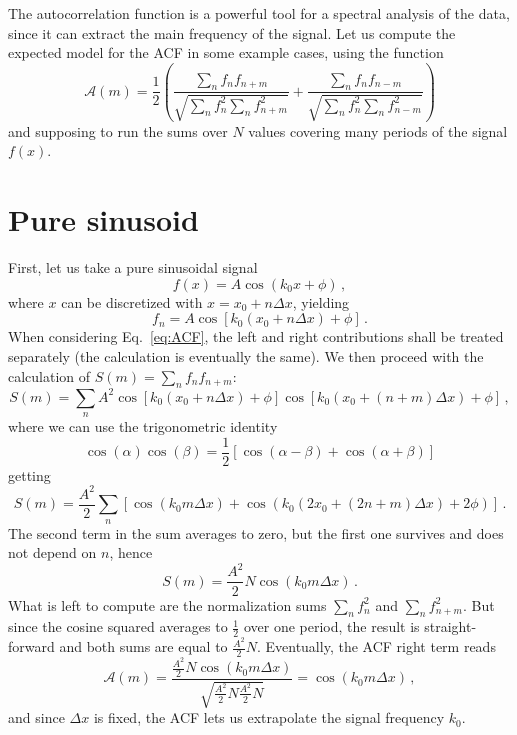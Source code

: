 \label{chap:app_ACF}
The autocorrelation function is a powerful tool for a spectral analysis of the data, since it can extract the main frequency of the signal. Let us compute the expected model for the ACF in some example cases, using the function
\begin{equation}
    \mathcal{A}(m) = \frac{1}{2} \left( \frac{\sum_{n} f_n f_{n+m}}{\sqrt{\sum_{n} f_n^2 \sum_{n} f_{n+m}^2}} + \frac{\sum_{n} f_n f_{n-m}}{\sqrt{\sum_{n} f_n^2 \sum_{n} f_{n-m}^2}} \right)
    \label{eq:ACF}
\end{equation}
and supposing to run the sums over $N$ values covering many periods of the signal $f(x)$.

\section{Pure sinusoid}
First, let us take a pure sinusoidal signal
\[
    f(x) = A\cos(k_0 x + \phi)\, ,
\]  
where $x$ can be discretized with $x = x_0 + n\Delta x$, yielding
\begin{equation*}
    f_n = A\cos[k_0(x_0 + n\Delta x) + \phi]\, .
\end{equation*}
When considering Eq.\ \eqref{eq:ACF}, the left and right contributions shall be treated separately (the calculation is eventually the same). We then proceed with the calculation of $S(m) = \sum_n f_n f_{n+m}$:
\begin{equation*}
    S(m) = \sum_n A^2 \cos[k_0(x_0 + n\Delta x) + \phi] \cos[k_0(x_0 + (n+m)\Delta x) + \phi]\, ,
\end{equation*}
where we can use the trigonometric identity
\[
    \cos(\alpha)\cos(\beta) = \frac{1}{2}[\cos(\alpha-\beta) + \cos(\alpha+\beta)]
\]
getting
\begin{equation*}
    S(m) = \frac{A^2}{2}\sum_n [\cos(k_0 m \Delta x) + \cos(k_0(2x_0 + (2n + m)\Delta x) + 2\phi)]\, .
\end{equation*}
The second term in the sum averages to zero, but the first one survives and does not depend on $n$, hence
\[
    S(m) = \frac{A^2}{2}N\cos(k_0 m \Delta x)\, .
\]
What is left to compute are the normalization sums $\sum_n f_n^2$ and $\sum_n f_{n+m}^2$. But since the cosine squared averages to $\frac{1}{2}$ over one period, the result is straight-forward and both sums are equal to $\frac{A^2}{2}N$. Eventually, the ACF right term reads
\begin{equation*}
    \mathcal{A}(m) = \frac{\frac{A^2}{2}N\cos(k_0 m \Delta x)}{\sqrt{\frac{A^2}{2}N \frac{A^2}{2}N}} = \cos(k_0 m \Delta x)\, ,
\end{equation*}
and since $\Delta x$ is fixed, the ACF lets us extrapolate the signal frequency $k_0$.

